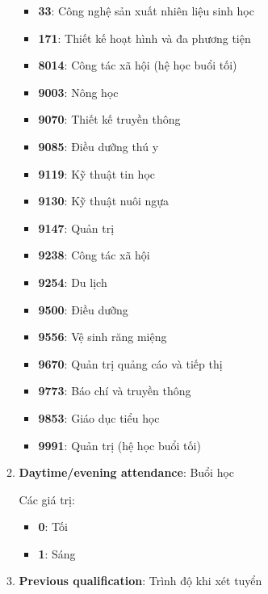 \begin{itemize}
\begin{enumerate}
            \begin{itemize}
              \item \textbf{33}: Công nghệ sản xuất nhiên liệu sinh học
              \item \textbf{171}: Thiết kế hoạt hình và đa phương tiện
              \item \textbf{8014}: Công tác xã hội (hệ học buổi tối)
              \item \textbf{9003}: Nông học
              \item \textbf{9070}: Thiết kế truyền thông
              \item \textbf{9085}: Điều dưỡng thú y
              \item \textbf{9119}: Kỹ thuật tin học
              \item \textbf{9130}: Kỹ thuật nuôi ngựa
              \item \textbf{9147}: Quản trị
              \item \textbf{9238}: Công tác xã hội
              \item \textbf{9254}: Du lịch
              \item \textbf{9500}: Điều dưỡng
              \item \textbf{9556}: Vệ sinh răng miệng
              \item \textbf{9670}: Quản trị quảng cáo và tiếp thị
              \item \textbf{9773}: Báo chí và truyền thông
              \item \textbf{9853}: Giáo dục tiểu học
              \item \textbf{9991}: Quản trị (hệ học buổi tối)
            \end{itemize}

            \item \textbf{Daytime/evening attendance}: Buổi học
            
            Các giá trị:
            \begin{itemize}
                \item \textbf{0}: Tối
                \item \textbf{1}: Sáng
            \end{itemize}

            \item \textbf{Previous qualification}: Trình độ khi xét tuyển


\end{enumerate}
\end{itemize}
